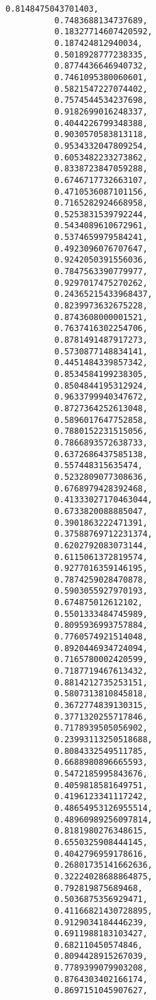 \documentclass[11pt]{article}
\begin{document}
\begin{Verbatim}[commandchars=\\\{\}]
          0.8148475043701403,
          0.7483688134737689,
          0.18327714607420592,
          0.187424812940034,
          0.5018928777238335,
          0.8774436646940732,
          0.7461095380060601,
          0.5821547227074402,
          0.7574544534237698,
          0.9182699016248337,
          0.4044226799348388,
          0.9030570583813118,
          0.9534332047809254,
          0.6053482233273862,
          0.8338723847059288,
          0.6746717732663107,
          0.4710536087101156,
          0.7165282924668958,
          0.5253831539792244,
          0.5434089610672961,
          0.5374659979584241,
          0.4923096076707647,
          0.9242050391556036,
          0.7847563390779977,
          0.9297017475270262,
          0.24365215433968437,
          0.8239973632675228,
          0.8743608000001521,
          0.7637416302254706,
          0.8781491487917273,
          0.5730877148834141,
          0.4451484339857342,
          0.8534584199238305,
          0.8504844195312924,
          0.9633799940347672,
          0.8727364252613048,
          0.5896017647752858,
          0.7880152231515056,
          0.7866893572638733,
          0.6372686437585138,
          0.557448315635474,
          0.5232809077308636,
          0.6768979428392468,
          0.41333027170463044,
          0.6733820088885047,
          0.3901863222471391,
          0.37588769712231374,
          0.6202792083073144,
          0.6115061372819574,
          0.9277016359146195,
          0.7874259028470878,
          0.5903055927970193,
          0.674875012612102,
          0.5501333484745989,
          0.8095936993757884,
          0.7760574921514048,
          0.8920446934724094,
          0.7165780002420599,
          0.7187719467613432,
          0.8814212735253151,
          0.5807313810845818,
          0.3672774839130315,
          0.3771320255717846,
          0.7178939505056902,
          0.23993113250518688,
          0.8084332549511785,
          0.6688980896665593,
          0.5472185995843676,
          0.4059818581649751,
          0.4196123341117242,
          0.48654953126955514,
          0.48960989256097814,
          0.8181980276348615,
          0.6550325908444145,
          0.4042796959178616,
          0.26801735141662636,
          0.32224028688864875,
          0.792819875689468,
          0.5036875356929471,
          0.41166821430728895,
          0.9129034184446239,
          0.6911988183103427,
          0.682110450574846,
          0.8094428915267039,
          0.7789399079903208,
          0.8764303402166174,
          0.8697151045907627,

\end{Verbatim}
\end{document}
